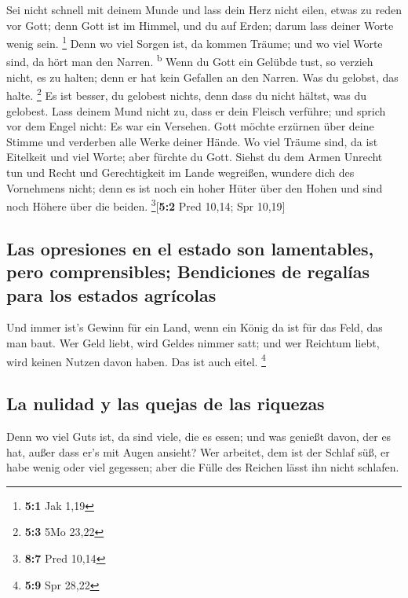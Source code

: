  Sei nicht schnell mit deinem Munde und lass dein Herz
nicht eilen, etwas zu reden vor Gott; denn Gott ist im Himmel, und du
auf Erden; darum lass deiner Worte wenig sein. \footnote{\textbf{5:1}
  Jak 1,19}  Denn wo viel Sorgen ist, da kommen Träume;
und wo viel Worte sind, da hört man den Narren. \textsuperscript{b}
 Wenn du Gott ein Gelübde tust, so verzieh nicht, es zu
halten; denn er hat kein Gefallen an den Narren. Was du gelobst, das
halte. \footnote{\textbf{5:3} 5Mo 23,22}  Es ist besser,
du gelobest nichts, denn dass du nicht hältst, was du gelobest.
 Lass deinem Mund nicht zu, dass er dein Fleisch verführe;
und sprich vor dem Engel nicht: Es war ein Versehen. Gott möchte
erzürnen über deine Stimme und verderben alle Werke deiner Hände.
 Wo viel Träume sind, da ist Eitelkeit und viel Worte;
aber fürchte du Gott.  Siehst du dem Armen Unrecht tun und
Recht und Gerechtigkeit im Lande wegreißen, wundere dich des Vornehmens
nicht; denn es ist noch ein hoher Hüter über den Hohen und sind noch
Höhere über die beiden. \footnote{\textbf{8:7} Pred 10,14}{[}\textbf{5:2}
Pred 10,14; Spr 10,19{]}

\hypertarget{las-opresiones-en-el-estado-son-lamentables-pero-comprensibles-bendiciones-de-regaluxedas-para-los-estados-agruxedcolas}{%
\subsection{Las opresiones en el estado son lamentables, pero
comprensibles; Bendiciones de regalías para los estados
agrícolas}\label{las-opresiones-en-el-estado-son-lamentables-pero-comprensibles-bendiciones-de-regaluxedas-para-los-estados-agruxedcolas}}

 Und immer ist's Gewinn für ein Land, wenn ein König da
ist für das Feld, das man baut.  Wer Geld liebt, wird
Geldes nimmer satt; und wer Reichtum liebt, wird keinen Nutzen davon
haben. Das ist auch eitel. \footnote{\textbf{5:9} Spr 28,22}

\hypertarget{la-nulidad-y-las-quejas-de-las-riquezas}{%
\subsection{La nulidad y las quejas de las
riquezas}\label{la-nulidad-y-las-quejas-de-las-riquezas}}

 Denn wo viel Guts ist, da sind viele, die es essen; und
was genießt davon, der es hat, außer dass er's mit Augen ansieht?
 Wer arbeitet, dem ist der Schlaf süß, er habe wenig oder
viel gegessen; aber die Fülle des Reichen lässt ihn nicht schlafen.

